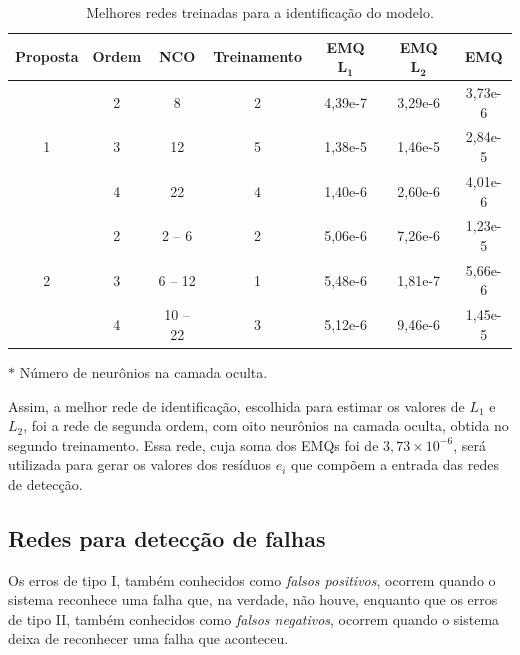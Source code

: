 \begin{table}[htb]
\small
\centering
\caption{Melhores redes treinadas para a identificação do modelo.}
\label{tab:melhores_rnas_ident}
\vspace{0.25cm}
\begin{threeparttable}
\begin{tabular}{|c|c|c|c|c|c|c|}
\hline
{\bf Proposta} & 
{\bf Ordem} & 
{\bf NCO\tnote{$*$}} & 
{\bf Treinamento} &
{\bf EMQ $\mathbf{L_1}$} & 
{\bf EMQ $\mathbf{L_2}$} & 
{\bf EMQ}\\
\hline
\hline
\multirow{3}{*}{1} &
\cellcolor[gray]{0.9} 2 &
\cellcolor[gray]{0.9} 8 &
\cellcolor[gray]{0.9}2 &
\cellcolor[gray]{0.9} 4,39e-7 &
\cellcolor[gray]{0.9} 3,29e-6 &
\cellcolor[gray]{0.9} 3,73e-6\\
\cline{2-7}
&3 & 12 & 5 & 1,38e-5 & 1,46e-5 & 2,84e-5\\
\cline{2-7}
&4 & 22 & 4 & 1,40e-6 & 2,60e-6 & 4,01e-6\\
\hline
\multirow{3}{*}{2} & 2 & 2 -- 6 & 2 & 5,06e-6 & 7,26e-6 & 1,23e-5\\
\cline{2-7}
& 3 & 6 -- 12 & 1 & 5,48e-6 & 1,81e-7 & 5,66e-6\\
\cline{2-7}
& 4 & 10 -- 22 & 3 & 5,12e-6 & 9,46e-6 & 1,45e-5\\
\hline
\end{tabular}
\begin{tablenotes}
\item [$*$] Número de neurônios na camada oculta.
\end{tablenotes}
\end{threeparttable}
\end{table}

Assim, a melhor rede de identificação, escolhida para estimar os valores de
$L_1$ e $L_2$, foi a rede de segunda ordem, com oito neurônios na camada oculta,
obtida no segundo treinamento. Essa rede, cuja soma dos EMQs foi de $3,73 \times
10^{-6}$, será utilizada para gerar os valores dos resíduos $e_i$
que compõem a entrada das redes de detecção.

\subsection{Redes para detecção de falhas}
Os erros de tipo I, também conhecidos como {\it falsos positivos}, ocorrem
quando o sistema reconhece uma falha que, na verdade, não houve, enquanto que os
erros de tipo II, também conhecidos como {\it falsos negativos}, ocorrem quando
o sistema deixa de reconhecer uma falha que aconteceu.


